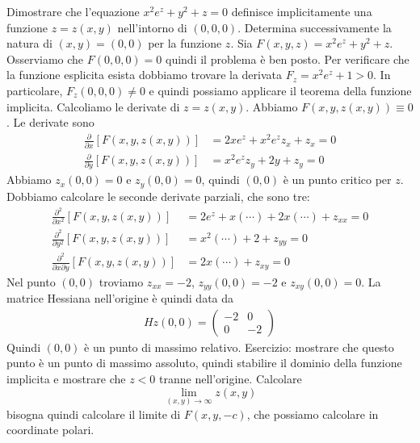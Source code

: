 \documentclass[a4paper]{article}
\begin{document}
\begin{radioactive}
\begin{snippetexercise}{}
    Dimostrare che l'equazione \(x^2e^z + y^2 + z = 0\)
    definisce implicitamente una funzione \(z=z(x,y)\)
    nell'intorno di \((0,0,0)\).
    Determina successivamente la natura di \((x,y) =(0,0)\)
    per la funzione \(z\).
    Sia \(F(x,y,z) = x^2e^z + y^2 + z\).
    Osserviamo che \(F(0,0,0) = 0\) quindi il problema è ben posto.
    Per verificare che la funzione esplicita esista dobbiamo trovare la derivata
    \(F_z = x^2e^z + 1 > 0\).
    In particolare, \(F_z(0,0,0) \neq 0\) e quindi possiamo applicare il teorema della funzione implicita.
    Calcoliamo le derivate di \(z=z(x,y)\).
    Abbiamo \(F(x,y, z(x,y)) \equiv 0\).
    Le derivate sono
    \begin{align*}
        \frac{\partial}{\partial x} \left[F(x,y,z(x,y))\right]
        &= 2xe^z + x^2 e^z z_x + z_x = 0
        \\
        \frac{\partial}{\partial y} \left[F(x,y,z(x,y))\right]
        &= x^2e^z z_y + 2y + z_y = 0
    \end{align*}
    Abbiamo \(z_x(0,0) = 0\) e \(z_y(0,0) = 0\),
    quindi \((0,0)\) è un punto critico per \(z\).
    Dobbiamo calcolare le seconde derivate parziali, che sono tre:
    \begin{align*}
        \frac{\partial^2}{\partial x^2} \left[F(x,y, z(x,y))\right]
        &= 2e^z + x(\cdots) + 2x(\cdots) + z_{xx} = 0
        \\
        \frac{\partial^2}{\partial y^2} \left[F(x,y, z(x,y))\right]
        &= x^2(\cdots) + 2 + z_{yy} = 0
        \\
        \frac{\partial^2}{\partial x \partial y} \left[F(x,y, z(x,y))\right]
        &= 2x(\cdots) + z_{xy} = 0
    \end{align*}
    Nel punto \((0,0)\) troviamo \(z_{xx} = -2\), \(z_{yy}(0,0) = -2\)
    e \(z_{xy}(0,0)=0\).
    La matrice Hessiana nell'origine è quindi data da
    \begin{align*}
        Hz(0,0) = \begin{pmatrix}
            -2 & 0 \\ 0 & -2
        \end{pmatrix}
    \end{align*}
    Quindi \((0,0)\) è un punto di massimo relativo.
    Esercizio: mostrare che questo punto è un punto di massimo assoluto,
    quindi stabilire il dominio della funzione implicita
    e mostrare che \(z < 0\) tranne nell'origine.
    Calcolare
    \[
        \lim_{(x,y) \to \infty} z(x,y)
    \]
    bisogna quindi calcolare il limite di \(F(x,y, -c)\),
    che possiamo calcolare in coordinate polari.
\end{snippetexercise}
\end{radioactive}
\end{document}
